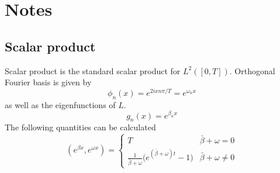 \documentclass[
a4paper,%
10pt,%
titlepage,%
twoside%
]{article}
\begin{document}

\section{Notes}

\subsection{Scalar product}

Scalar product is the standard scalar product for
$L^2([0,T])$. Orthogonal Fourier basis is given by
\begin{equation}
  \label{eq:fourier_base}
  \phi_n(x)=e^{2 i x n \pi/T}=e^{\omega_n x}
\end{equation}
as well as the eigenfunctions of $L$.
\begin{equation}
  g_n(x)=e^{ \beta_n x}
\end{equation}
The following quantities can be calculated
\begin{equation}
  (e^{\beta x},e^{\omega x})=
  \begin{cases}
    T & \bar\beta+\omega=0 \\
    \frac{1}{\bar{\beta}+\omega}\big(e^{(\bar\beta+\omega)t}-1\big)         & \bar\beta+\omega\ne0
  \end{cases}
\end{equation}
\end{document}
